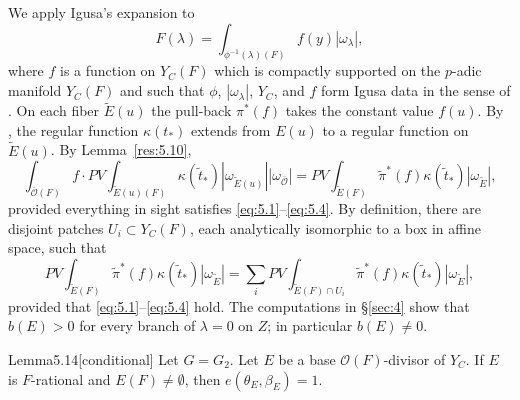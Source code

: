 \documentclass[12pt,letterpaper]{amsart}
\theoremstyle{plain}
\theoremstyle{definition}
\theoremstyle{remark}
\theoremstyle{definition}
\newcommand{\ooo}{\mathcal{O}}
\newcommand{\ovo}{\overline{\mathcal{O}}}
\begin{document}
We apply Igusa's expansion to
\begin{equation}\tag{5.11}\label{eq:5.11}
F(\lambda)=
\int_{\phi^{-1}(\lambda)(F)}f(y)|\omega_\lambda|,
\end{equation}
where $f$ is a function on $Y_C(F)$ which is compactly
supported on the $p$-adic manifold $Y_C(F)$ and such that $\phi$,
$|\omega_\lambda|$, $Y_C$, and $f$ form Igusa data in the sense of
\cite{LS83}. On each fiber
$\tilde{E}(u)$ the pull-back $\pi^*(f)$ takes the constant value $f(u)$.
By \cite[Ch.~I]{Ha92a}, the regular function $\kappa(t_*)$ extends
from $E(u)$ to a regular function on $\tilde{E}(u)$. By
Lemma~\ref{res:5.10},
\begin{equation}\tag{5.12}\label{eq:5.12}
\int_{\overline{\ooo}(F)}f \cdot
PV\int_{\tilde{E}(u)(F)}\kappa(\tilde{t}_*)
|\omega_{\tilde{E}(u)}||\omega_{\ovo}|=
PV\int_{\tilde{E}(F)}\tilde{\pi}^*(f) \kappa(\tilde{t}_*)
|\omega_{\tilde{E}}|,
\end{equation}
provided everything in sight satisfies \eqref{eq:5.1}--\eqref{eq:5.4}.
By definition, there are disjoint patches
$U_i\subset Y_C(F)$,
each analytically isomorphic to a box in affine space, such that
\begin{equation}\tag{5.13}\label{eq:5.13}
PV\int_{\tilde{E}(F)}\tilde{\pi}^*(f) \kappa(\tilde{t}_*)
|\omega_{\tilde{E}}|=
\sum_iPV\int_{\tilde{E}(F)\cap U_i}\tilde{\pi}^*(f) \kappa(\tilde{t}_*)
|\omega_{\tilde{E}}|,
\end{equation}
provided that \eqref{eq:5.1}--\eqref{eq:5.4} hold.
The computations in \S\ref{sec:4} show that $b(E)>0$ for every branch of
$\lambda=0$ on $Z$; in particular $b(E)\not= 0$.

\begin{res}{Lemma}{5.14}[conditional]\label{res:5.14}
Let $G=G_2$.
Let $E$ be a base ${\mathcal O}(F)$-divisor of
$Y_C$. If $E$ is $F$-rational and $E(F)\not= \emptyset$,
then $e(\theta_E,\beta_E)=1$.
\end{res}
\end{document}
